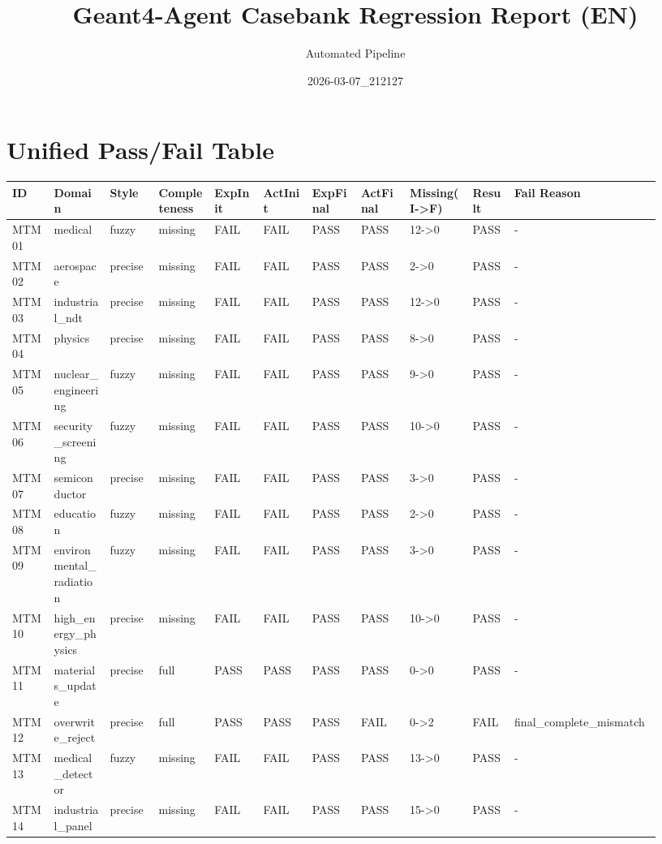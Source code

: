 \documentclass[11pt]{ctexart}
\title{Geant4-Agent Casebank Regression Report (EN)}
\author{Automated Pipeline}
\date{2026-03-07\_212127}
\begin{document}
\maketitle
\section{Unified Pass/Fail Table}
\begin{longtable}{p{0.06\linewidth}p{0.08\linewidth}p{0.07\linewidth}p{0.08\linewidth}p{0.07\linewidth}p{0.07\linewidth}p{0.07\linewidth}p{0.07\linewidth}p{0.09\linewidth}p{0.06\linewidth}p{0.21\linewidth}}
\toprule
ID & Domain & Style & Completeness & ExpInit & ActInit & ExpFinal & ActFinal & Missing(I->F) & Result & Fail Reason \\
\midrule
MTM01 & medical & fuzzy & missing & FAIL & FAIL & PASS & PASS & 12->0 & PASS & - \\
MTM02 & aerospace & precise & missing & FAIL & FAIL & PASS & PASS & 2->0 & PASS & - \\
MTM03 & industrial\_ndt & precise & missing & FAIL & FAIL & PASS & PASS & 12->0 & PASS & - \\
MTM04 & physics & precise & missing & FAIL & FAIL & PASS & PASS & 8->0 & PASS & - \\
MTM05 & nuclear\_engineering & fuzzy & missing & FAIL & FAIL & PASS & PASS & 9->0 & PASS & - \\
MTM06 & security\_screening & fuzzy & missing & FAIL & FAIL & PASS & PASS & 10->0 & PASS & - \\
MTM07 & semiconductor & precise & missing & FAIL & FAIL & PASS & PASS & 3->0 & PASS & - \\
MTM08 & education & fuzzy & missing & FAIL & FAIL & PASS & PASS & 2->0 & PASS & - \\
MTM09 & environmental\_radiation & fuzzy & missing & FAIL & FAIL & PASS & PASS & 3->0 & PASS & - \\
MTM10 & high\_energy\_physics & precise & missing & FAIL & FAIL & PASS & PASS & 10->0 & PASS & - \\
MTM11 & materials\_update & precise & full & PASS & PASS & PASS & PASS & 0->0 & PASS & - \\
MTM12 & overwrite\_reject & precise & full & PASS & PASS & PASS & FAIL & 0->2 & FAIL & final\_complete\_mismatch \\
MTM13 & medical\_detector & fuzzy & missing & FAIL & FAIL & PASS & PASS & 13->0 & PASS & - \\
MTM14 & industrial\_panel & precise & missing & FAIL & FAIL & PASS & PASS & 15->0 & PASS & - \\

\end{longtable}
\end{document}
